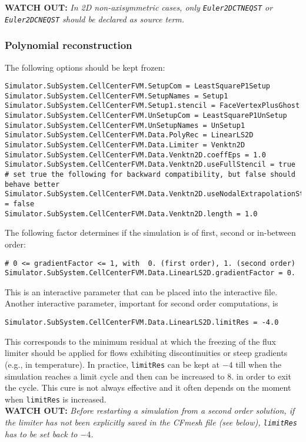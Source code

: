 \documentclass[11pt]{article}
\begin{document}
{\bf WATCH OUT:} {\it In 2D non-axisymmetric cases, only {\tt Euler2DCTNEQST} or {\tt Euler2DCNEQST} should be declared as source term.}

\subsubsection{Polynomial reconstruction}

The following options should be kept frozen:

\begin{verbatim}
Simulator.SubSystem.CellCenterFVM.SetupCom = LeastSquareP1Setup
Simulator.SubSystem.CellCenterFVM.SetupNames = Setup1
Simulator.SubSystem.CellCenterFVM.Setup1.stencil = FaceVertexPlusGhost
Simulator.SubSystem.CellCenterFVM.UnSetupCom = LeastSquareP1UnSetup
Simulator.SubSystem.CellCenterFVM.UnSetupNames = UnSetup1
Simulator.SubSystem.CellCenterFVM.Data.PolyRec = LinearLS2D
Simulator.SubSystem.CellCenterFVM.Data.Limiter = Venktn2D
Simulator.SubSystem.CellCenterFVM.Data.Venktn2D.coeffEps = 1.0
Simulator.SubSystem.CellCenterFVM.Data.Venktn2D.useFullStencil = true
# set true the following for backward compatibility, but false should behave better
Simulator.SubSystem.CellCenterFVM.Data.Venktn2D.useNodalExtrapolationStencil = false
Simulator.SubSystem.CellCenterFVM.Data.Venktn2D.length = 1.0
\end{verbatim}

The following factor determines if the simulation is of first, second or in-between order:

\begin{verbatim}
# 0 <= gradientFactor <= 1, with  0. (first order), 1. (second order)
Simulator.SubSystem.CellCenterFVM.Data.LinearLS2D.gradientFactor = 0.
\end{verbatim}
This is an interactive parameter that can be placed into the interactive file. Another interactive parameter,
important for second order computations, is 

\begin{verbatim}
Simulator.SubSystem.CellCenterFVM.Data.LinearLS2D.limitRes = -4.0
\end{verbatim}
This corresponds to the minimum residual at which the freezing of the flux limiter should be applied for flows exhibiting discontinuities 
or steep gradients (e.g., in temperature). In practice, {\tt limitRes} can be kept at  $-4$ till when the simulation reaches a limit cycle and then can be increased to
$8.$ in order to exit the cycle. This cure is not always effective and it often depends on the moment when {\tt limitRes} is increased.\\
{\bf WATCH OUT:} {\it Before restarting a simulation from a second order solution, if the limiter has not been explicitly saved in the CFmesh file 
  (see below), {\tt limitRes} has to be set back to $-4$.}
\end{document}
